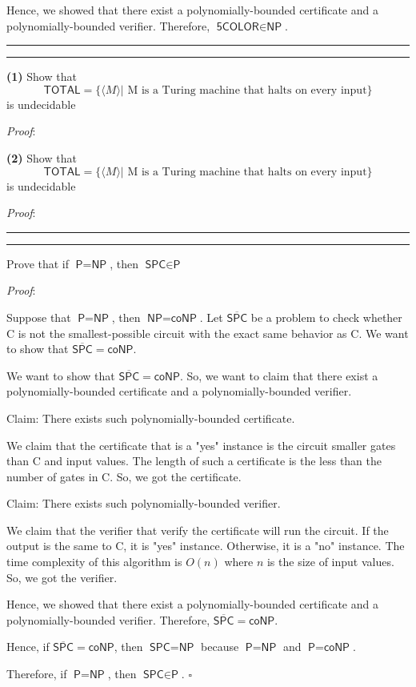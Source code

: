 \documentclass[a4paper, 11pt]{article}
\newcommand{\question}[2] {\vspace{.25in} \hrule\vspace{0.5em}
	\noindent{\bf #1: #2} \vspace{0.5em}
	\hrule \vspace{.10in}}
\renewcommand{\part}[1] {\vspace{.10in} {\bf (#1)}}
\begin{document}
	Hence, we showed that there exist a polynomially-bounded certificate and a polynomially-bounded verifier. Therefore, $\textsf{5COLOR} \in \textsf{NP}$.
		
	\question{4}{NP-Complete}
	
	\part{1} Show that 
	$$ \textsf{TOTAL} = \{\langle M \rangle | \text{ M is a Turing machine that halts on every input} \} $$ is undecidable


	{\em Proof}:  

	
	\part{2} Show that 
	$$ \textsf{TOTAL} = \{\langle M \rangle | \text{ M is a Turing machine that halts on every input} \} $$ is undecidable
	
	
	{\em Proof}: 
	
	\question{5}{Silver Lining If P = NP}
	
	Prove that if $\textsf{P} = \textsf{NP}$, then $\textsf{SPC} \in \textsf{P}$
	
	{\em Proof}: 
	
	Suppose that $\textsf{P} = \textsf{NP}$, then $\textsf{NP} = \textsf{coNP}$. Let $\overline{\textsf{SPC}}$ be a problem to check whether C is not the smallest-possible circuit with the exact same behavior as C. We want to show that $\overline{\textsf{SPC}}= \textsf{coNP}$.
	
	We want to show that $\overline{\textsf{SPC}}= \textsf{coNP}$. So, we want to claim that there exist a polynomially-bounded certificate and a polynomially-bounded verifier.
	
	Claim: There exists such polynomially-bounded certificate.
	
	We claim that the certificate that is a "yes" instance is the circuit smaller gates than C and input values. The length of such a certificate is the less than the number of gates in C. So, we got the certificate.
	
	Claim: There exists such polynomially-bounded verifier.
	
	We claim that the verifier that verify the certificate will run the circuit. If the  output is the same to C, it is "yes" instance. Otherwise, it is a "no" instance. The time complexity of this algorithm is $O(n)$ where $n$ is the size of input values. So, we got the verifier.
	
	Hence, we showed that there exist a polynomially-bounded certificate and a polynomially-bounded verifier. Therefore, $\overline{\textsf{SPC}}= \textsf{coNP}$.
	
	Hence, if $\overline{\textsf{SPC}}= \textsf{coNP}$, then $\textsf{SPC}= \textsf{NP}$ because $\textsf{P} = \textsf{NP}$ and $\textsf{P} = \textsf{coNP}$. 
	
	Therefore, if $\textsf{P} = \textsf{NP}$, then $\textsf{SPC} \in \textsf{P}$. $\square$
	
	
\end{document}

